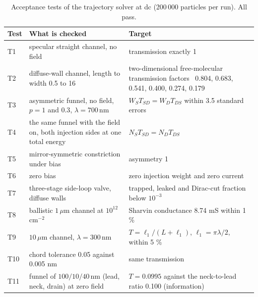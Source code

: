 \documentclass[aps,prapplied,onecolumn,superscriptaddress,floatfix]{revtex4-2}
\newcommand{\um}{\,\mu\mathrm{m}}
\newcommand{\nm}{\,\mathrm{nm}}
\begin{document}
\begin{table}[ht]
\caption{Acceptance tests of the trajectory solver at dc (200\,000 particles
per run). All pass.}
\begin{ruledtabular}
\begin{tabular}{lp{}p{}}
Test & What is checked & Target \\
\hline
T1 & specular straight channel, no field & transmission exactly 1 \\
T2 & diffuse-wall channel, length to width 0.5 to 16 & two-dimensional free-molecular transmission factors~\cite{richley1964numerical} 0.804, 0.683, 0.541, 0.400, 0.274, 0.179 \\
T3 & asymmetric funnel, no field, $p=1$ and $0.3$, $\lambda=700\nm$ & $W_{S}T_{SD}=W_{D}T_{DS}$ within 3.5 standard errors \\
T4 & the same funnel with the field on, both injection sides at one total energy & $N_{S}T_{SD}=N_{D}T_{DS}$ \\
T5 & mirror-symmetric constriction under bias & asymmetry 1 \\
T6 & zero bias & zero injection weight and zero current \\
T7 & three-stage side-loop valve, diffuse walls & trapped, leaked and Dirac-cut fraction below $10^{-3}$ \\
T8 & ballistic $1\um$ channel at $10^{12}$ cm$^{-2}$ & Sharvin conductance 8.74 mS within 1 \% \\
T9 & $10\um$ channel, $\lambda=300\nm$ & $T=\ell_{1}/(L+\ell_{1})$, $\ell_{1}=\pi\lambda/2$, within 5 \% \\
T10 & chord tolerance 0.05 against 0.005 nm & same transmission \\
T11 & funnel of $100/10/40\nm$ (lead, neck, drain) at zero field & $T=0.0995$ against the neck-to-lead ratio 0.100 (information) \\
\end{tabular}
\end{ruledtabular}
\end{table}
\end{document}
